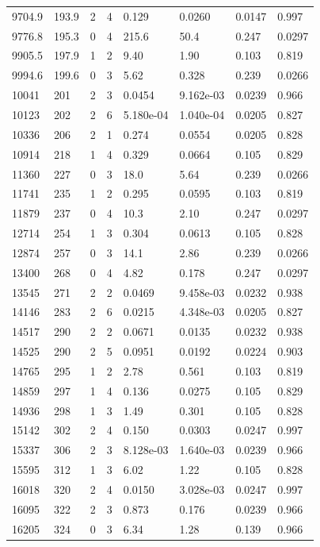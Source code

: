 \documentclass[preview]{standalone}
\begin{document}
{{{\begin{tabular}{L{1.2cm}C{1.2cm} C{0.3cm}C{0.5cm} C{1.4cm}C{1.4cm} C{1.4cm}C{1.4cm}}
  9704.9  &  193.9  & 2     &  4 &  0.129  & 0.0260  & 0.0147 &  0.997   \\ 
  9776.8  &  195.3  & 0     &  4 &  215.6  & 50.4  & 0.247 &  0.0297   \\ 
  9905.5  &  197.9  & 1     &  2 &  9.40  & 1.90  & 0.103 &  0.819   \\ 
  9994.6  &  199.6  & 0     &  3 &  5.62  & 0.328  & 0.239 &  0.0266   \\ 
  10041  &   201  & 2     &  3 &  0.0454  & 9.162e-03  & 0.0239 &  0.966   \\ 
  10123  &   202  & 2     &  6 &  5.180e-04  & 1.040e-04  & 0.0205 &  0.827   \\ 
  10336  &   206  & 2     &  1 &  0.274  & 0.0554  & 0.0205 &  0.828   \\ 
  10914  &   218  & 1     &  4 &  0.329  & 0.0664  & 0.105 &  0.829   \\ 
  11360  &   227  & 0     &  3 &  18.0  & 5.64  & 0.239 &  0.0266   \\ 
  11741  &   235  & 1     &  2 &  0.295  & 0.0595  & 0.103 &  0.819   \\ 
  11879  &   237  & 0     &  4 &  10.3  & 2.10  & 0.247 &  0.0297   \\ 
  12714  &   254  & 1     &  3 &  0.304  & 0.0613  & 0.105 &  0.828   \\ 
  12874  &   257  & 0     &  3 &  14.1  & 2.86  & 0.239 &  0.0266   \\ 
  13400  &   268  & 0     &  4 &  4.82  & 0.178  & 0.247 &  0.0297   \\ 
  13545  &   271  & 2     &  2 &  0.0469  & 9.458e-03  & 0.0232 &  0.938   \\ 
  14146  &   283  & 2     &  6 &  0.0215  & 4.348e-03  & 0.0205 &  0.827   \\ 
  14517  &   290  & 2     &  2 &  0.0671  & 0.0135  & 0.0232 &  0.938   \\ 
  14525  &   290  & 2     &  5 &  0.0951  & 0.0192  & 0.0224 &  0.903   \\ 
  14765  &   295  & 1     &  2 &  2.78  & 0.561  & 0.103 &  0.819   \\ 
  14859  &   297  & 1     &  4 &  0.136  & 0.0275  & 0.105 &  0.829   \\ 
  14936  &   298  & 1     &  3 &  1.49  & 0.301  & 0.105 &  0.828   \\ 
  15142  &   302  & 2     &  4 &  0.150  & 0.0303  & 0.0247 &  0.997   \\ 
  15337  &   306  & 2     &  3 &  8.128e-03  & 1.640e-03  & 0.0239 &  0.966   \\ 
  15595  &   312  & 1     &  3 &  6.02  & 1.22  & 0.105 &  0.828   \\ 
  16018  &   320  & 2     &  4 &  0.0150  & 3.028e-03  & 0.0247 &  0.997   \\ 
  16095  &   322  & 2     &  3 &  0.873  & 0.176  & 0.0239 &  0.966   \\ 
  16205  &   324  & 0     &  3 &  6.34  & 1.28  & 0.139 &  0.966   \\ 
\hline 
\end{tabular} 

}}}
\end{document}
